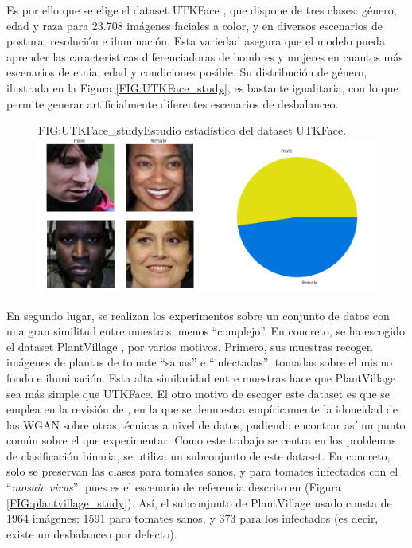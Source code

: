 Es por ello que se elige el dataset UTKFace \cite{UTKFACE,zhifei2017cvpr}, que dispone de tres clases: género, edad y raza para 23.708 imágenes faciales a color, y en diversos escenarios de postura, resolución e iluminación. Esta variedad asegura que el modelo pueda aprender las características diferenciadoras de hombres y mujeres en cuantos más escenarios de etnia, edad y condiciones posible. Su distribución de género, ilustrada en la Figura \ref{FIG:UTKFace_study}, es bastante igualitaria, con lo que permite generar artificialmente diferentes escenarios de desbalanceo. %

\begin{figure}[Estudio UTKFace]{FIG:UTKFace_study}{Estudio estadístico del dataset UTKFace.}
    \centering
    \includegraphics[width=14cm]{img/utk_gender.png}
\end{figure}

En segundo lugar, se realizan los experimentos sobre un conjunto de datos con una gran similitud entre muestras, menos ``complejo''. En concreto, se ha escogido el dataset PlantVillage \cite{hughes2015open}, por varios motivos. Primero, sus muestras recogen imágenes de plantas de tomate ``sanas'' e ``infectadas'', tomadas sobre el mismo fondo e iluminación. Esta alta similaridad entre muestras hace que PlantVillage sea más simple que UTKFace. El otro motivo de escoger este dataset es que se emplea en la revisión de \citet{nafi2020addressing}, en la que se demuestra empíricamente la idoneidad de las WGAN sobre otras técnicas a nivel de datos, pudiendo encontrar así un punto común sobre el que experimentar. Como este trabajo se centra en los problemas de clasificación binaria, se utiliza un subconjunto de este dataset. En concreto, solo se preservan las clases para tomates sanos, y para tomates infectados con el ``\textit{mosaic virus}'', pues es el escenario de referencia descrito en \citet{nafi2020addressing} (Figura \ref{FIG:plantvillage_study}). Así, el subconjunto de PlantVillage usado consta de 1964 imágenes: 1591 para tomates sanos, y 373 para los infectados (es decir, existe un desbalanceo por defecto).

